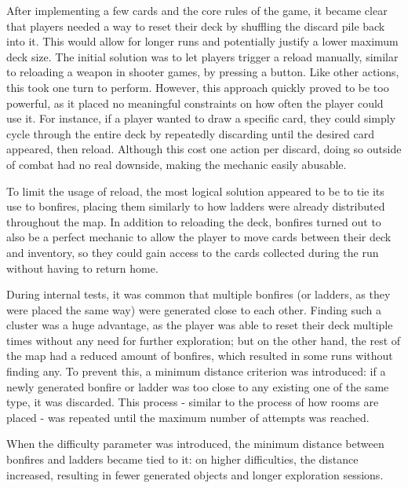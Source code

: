 After implementing a few cards and the core rules of the game, it became clear that players needed a way to reset their deck by shuffling the discard pile back into it. This would allow for longer runs and potentially justify a lower maximum deck size. The initial solution was to let players trigger a reload manually, similar to reloading a weapon in shooter games, by pressing a button. Like other actions, this took one turn to perform. However, this approach quickly proved to be too powerful, as it placed no meaningful constraints on how often the player could use it. For instance, if a player wanted to draw a specific card, they could simply cycle through the entire deck by repeatedly discarding until the desired card appeared, then reload. Although this cost one action per discard, doing so outside of combat had no real downside, making the mechanic easily abusable.

To limit the usage of reload, the most logical solution appeared to be to tie its use to bonfires, placing them similarly to how ladders were already distributed throughout the map. In addition to reloading the deck, bonfires turned out to also be a perfect mechanic to allow the player to move cards between their deck and inventory, so they could gain access to the cards collected during the run without having to return home.

During internal tests, it was common that multiple bonfires (or ladders, as they were placed the same way) were generated close to each other. Finding such a cluster was a huge advantage, as the player was able to reset their deck multiple times without any need for further exploration; but on the other hand, the rest of the map had a reduced amount of bonfires, which resulted in some runs without finding any. To prevent this, a minimum distance criterion was introduced: if a newly generated bonfire or ladder was too close to any existing one of the same type, it was discarded. This process - similar to the process of how rooms are placed - was repeated until the maximum number of attempts was reached.

When the difficulty parameter was introduced, the minimum distance between bonfires and ladders became tied to it: on higher difficulties, the distance increased, resulting in fewer generated objects and longer exploration sessions.


